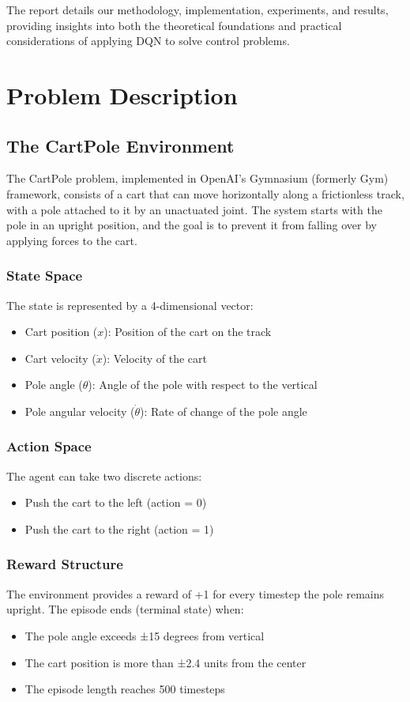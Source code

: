\documentclass[11pt,a4paper]{article}
\begin{document}
The report details our methodology, implementation, experiments, and results, providing insights into both the theoretical foundations and practical considerations of applying DQN to solve control problems.

\section{Problem Description}

\subsection{The CartPole Environment}

The CartPole problem, implemented in OpenAI's Gymnasium (formerly Gym) framework, consists of a cart that can move horizontally along a frictionless track, with a pole attached to it by an unactuated joint. The system starts with the pole in an upright position, and the goal is to prevent it from falling over by applying forces to the cart.

\subsubsection{State Space}
The state is represented by a 4-dimensional vector:
\begin{itemize}
    \item Cart position ($x$): Position of the cart on the track
    \item Cart velocity ($\dot{x}$): Velocity of the cart
    \item Pole angle ($\theta$): Angle of the pole with respect to the vertical
    \item Pole angular velocity ($\dot{\theta}$): Rate of change of the pole angle
\end{itemize}

\subsubsection{Action Space}
The agent can take two discrete actions:
\begin{itemize}
    \item Push the cart to the left (action = 0)
    \item Push the cart to the right (action = 1)
\end{itemize}

\subsubsection{Reward Structure}
The environment provides a reward of +1 for every timestep the pole remains upright. The episode ends (terminal state) when:
\begin{itemize}
    \item The pole angle exceeds ±15 degrees from vertical
    \item The cart position is more than ±2.4 units from the center
    \item The episode length reaches 500 timesteps
\end{itemize}
\end{document}
